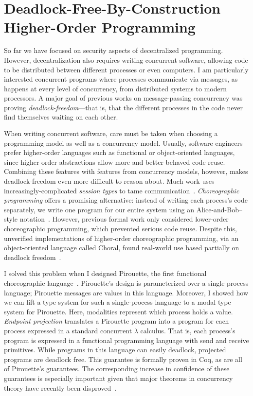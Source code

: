 \documentclass{article}
\theoremstyle{definition}
\begin{document}
\section*{Deadlock-Free-By-Construction Higher-Order Programming}

So far we have focused on security aspects of decentralized programming.
However, decentralization also requires writing concurrent software, allowing code to be distributed between different processes or even computers.
I am particularly interested concurrent programs where processes communicate via messages, as happens at every level of concurrency, from distributed systems to modern processors.
A major goal of previous works on message-passing concurrency was proving \emph{deadlock-freedom}---that is, that the different processes in the code never find themselves waiting on each other.

When writing concurrent software, care must be taken when choosing a programming model as well as a concurrency model.
Usually, software engineers prefer higher-order languages such as functional or object-oriented languages, since higher-order abstractions allow more and better-behaved code reuse.
Combining these features with features from concurrency models, however, makes deadlock-freedom even more difficult to reason about.
Much work uses increasingly-complicated \emph{session types} to tame communication~\citep{ScalasY19,HondaYC16}.
\emph{Choreographic programming} offers a promising alternative: instead of writing each process's code separately, we write one program for our entire system using an Alice-and-Bob--style notation~\citep{Montesi13}.
However, previous formal work only considered lower-order choreographic programming, which prevented serious code reuse.
Despite this, unverified implementations of higher-order choreographic programming, via an object-oriented language called Choral, found real-world use based partially on deadlock freedom~\citep{GiallorenzoMP20}.

I solved this problem when I designed Pirouette, the first functional choreographic language~\citep{HirschG22}.
Pirouette's design is parameterized over a single-process language; Pirouette messages are values in this language.
Moreover, I showed how we can lift a type system for such a single-process language to a modal type system for Pirouette.
Here, modalities represent which process holds a value.
\emph{Endpoint projection} translates a Pirouette program into a program for each process expressed in a standard concurrent $\lambda$ calculus.
That is, each process's program is expressed in a functional programming language with \textsf{send} and \textsf{receive} primitives.
While programs in this language can easily deadlock, projected programs are deadlock free.
This guarantee is formally proven in Coq, as are all of Pirouette's guarantees.
The corresponding increase in confidence of these guarantees is especially important given that major theorems in concurrency theory have recently been disproved~\citep{Cruz-FilipeMP19}.
\end{document}
